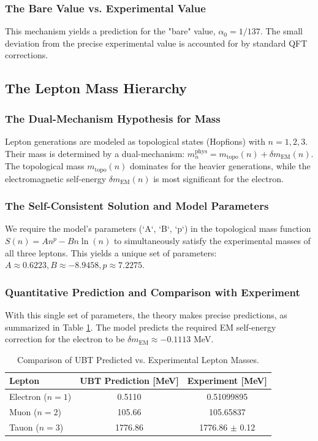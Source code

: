 \documentclass[12pt, a4paper]{article}
\begin{document}
\subsubsection{The Bare Value vs. Experimental Value}
This mechanism yields a prediction for the "bare" value, \( \alpha_0 = 1/137 \). The small deviation from the precise experimental value is accounted for by standard QFT corrections.

\subsection{The Lepton Mass Hierarchy}
\subsubsection{The Dual-Mechanism Hypothesis for Mass}
Lepton generations are modeled as topological states (Hopfions) with \( n=1,2,3 \). Their mass is determined by a dual-mechanism: \( m_n^{\text{phys}} = m_{\text{topo}}(n) + \delta m_{\text{EM}}(n) \). The topological mass \( m_{\text{topo}}(n) \) dominates for the heavier generations, while the electromagnetic self-energy \( \delta m_{\text{EM}}(n) \) is most significant for the electron.

\subsubsection{The Self-Consistent Solution and Model Parameters}
We require the model's parameters (`A`, `B`, `p`) in the topological mass function \( S(n) = A n^p - B n \ln(n) \) to simultaneously satisfy the experimental masses of all three leptons. This yields a unique set of parameters: \( A \approx 0.6223, B \approx -8.9458, p \approx 7.2275 \).

\subsubsection{Quantitative Prediction and Comparison with Experiment}
With this single set of parameters, the theory makes precise predictions, as summarized in Table \ref{tab:masses}. The model predicts the required EM self-energy correction for the electron to be \( \delta m_{\text{EM}} \approx -0.1113 \) MeV.

\begin{table}[h!]
\centering
\caption{Comparison of UBT Predicted vs. Experimental Lepton Masses.}
\label{tab:masses}
\begin{tabular}{l|c|c}
\hline
\textbf{Lepton} & \textbf{UBT Prediction [MeV]} & \textbf{Experiment [MeV]} \\
\hline
Electron (\(n=1\)) & 0.5110 & 0.51099895 \\
Muon (\(n=2\)) & 105.66 & 105.65837 \\
Tauon (\(n=3\)) & 1776.86 & 1776.86 \(\pm\) 0.12 \\
\hline
\end{tabular}
\end{table}
\end{document}
